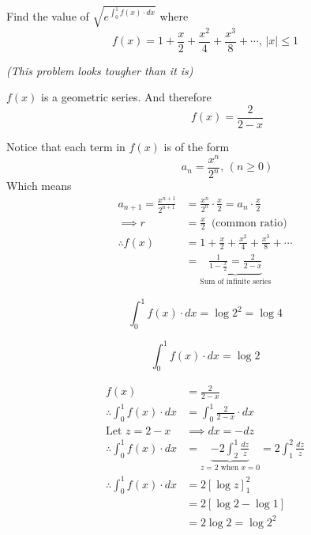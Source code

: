 \documentclass[14pt,fleqn]{extarticle}
\newcommand\fxe{1+\frac{x}{2} + \frac{x^2}{4} + \frac{x^3}{8} + \cdots}
\begin{document}
 
\begin{problem}
	\statement 
    
    Find the value of $\sqrt{e^{\int_0^1 f(x)\cdot dx}}$ where 
    \[ f(x) = \fxe,\, \vert x\vert \leq 1  \]
    
    \textit{(This problem looks tougher than it is)}

	\begin{step}
  \begin{options} 
     \correct 
       
     $f(x)$ is a geometric series. And therefore 
     \[ \qquad\qquad f(x) = \frac{2}{2-x} \]
        
    \end{options} 
     \reason 
     
     Notice that each term in $f(x)$ is of the form 
     \[ \qquad\qquad a_n = \frac{x^n}{2^n},\, \left(n\geq 0 \right)\]
     Which means 
     \begin{align}
     a_{n+1} = \frac{x^{n+1}}{2^{n+1}} &= \frac{x^n}{2^n}\cdot\frac{x}{2} = a_n\cdot\frac{x}{2} \\[10pt]
     \implies r &= \frac{x}{2}\,\text{ (common ratio)} \\
     \therefore f(x) &= \fxe \\[-5pt]
     &= \underbrace{\frac{1}{1-\frac{x}{2}} = \frac{2}{2-x}}_{\text{Sum of infinite series}}
\end{align}
       
\end{step}

\begin{step}
  \begin{options} 
     \correct 
     
     \[ \int_0^1 f(x)\cdot dx = \log 2^2 = \log 4 \]
       
     \incorrect
     
     \[ \int_0^1 f(x)\cdot dx = \log 2 \]
    \end{options} 
     \reason
     
     \begin{align}
     f(x) &= \frac{2}{2-x} \\
     \therefore \int_0^1 f(x)\cdot dx &= \int_0^1\frac{2}{2-x}\cdot dx \\
     \text{Let } z = 2-x &\implies dx = -dz  \\
     \therefore \int_0^1 f(x)\cdot dx &= \underbrace{-2\int_2^1\frac{dz}{z}}_{z = 2\text{ when } x = 0} = 2\int_1^2\frac{dz}{z} \\
     \therefore \int_0^1 f(x)\cdot dx &= 2 \left[\log z \right]_1^2 \\ 
     &= 2 \left[\log 2 - \log 1 \right] \\
     &= 2\log 2 = \log 2^2 
\end{align} 
       

\end{step}
\end{problem}
\end{document}
